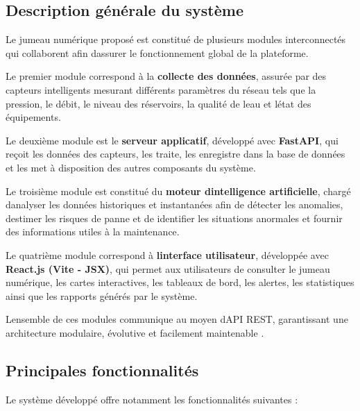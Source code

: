 \subsection{Description générale du système}\label{description-guxe9nuxe9rale-du-systuxe8me}

Le jumeau numérique proposé est constitué de plusieurs modules
interconnectés qui collaborent afin d\textquotesingle assurer le
fonctionnement global de la plateforme.

Le premier module correspond à la \textbf{collecte des données}, assurée
par des capteurs intelligents mesurant différents paramètres du réseau
tels que la pression, le débit, le niveau des réservoirs, la qualité de
l\textquotesingle eau et l\textquotesingle état des équipements.

Le deuxième module est le \textbf{serveur applicatif}, développé avec
\textbf{FastAPI}, qui reçoit les données des capteurs, les traite, les
enregistre dans la base de données et les met à disposition des autres
composants du système.

Le troisième module est constitué du \textbf{moteur
	d\textquotesingle intelligence artificielle}, chargé
d\textquotesingle analyser les données historiques et instantanées afin
de détecter les anomalies, d\textquotesingle estimer les risques de
panne et de identifier les situations anormales et fournir des informations utiles
à la maintenance.

Le quatrième module correspond à \textbf{l\textquotesingle interface
	utilisateur}, développée avec \textbf{React.js (Vite - JSX)}, qui permet
aux utilisateurs de consulter le jumeau numérique, les cartes
interactives, les tableaux de bord, les alertes, les statistiques ainsi
que les rapports générés par le système.

L\textquotesingle ensemble de ces modules communique au moyen
d\textquotesingle API REST, garantissant une architecture modulaire,
évolutive et facilement maintenable \cite{ref114}.

\subsection{Principales fonctionnalités}\label{principales-fonctionnalituxe9s}

Le système développé offre notamment les fonctionnalités suivantes :

